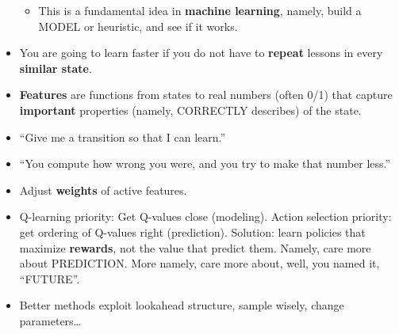\documentclass[twocolumn]{article}
\begin{document}
\begin{itemize}
\begin{itemize}
  \item This is a fundamental idea in \textbf{machine learning},
    namely, build a MODEL or heuristic, and see if it works.
  \end{itemize}
\item You are going to learn faster if you do not have to
  \textbf{repeat} lessons in every \textbf{similar state}.
\item \textbf{Features} are functions from states to real numbers
  (often 0/1) that capture \textbf{important} properties (namely,
  CORRECTLY describes) of the state.
\item ``Give me a transition so that I can learn.''
\item ``You compute how wrong you were, and you try to make that
  number less.''
\item Adjust \textbf{weights} of active features.
\item Q-learning priority: Get Q-values close (modeling). Action
  selection priority: get ordering of Q-values right
  (prediction). Solution: learn policies that maximize
  \textbf{rewards}, not the value that predict them. Namely, care more
  about PREDICTION. More namely, care more about, well, you named it,
  ``FUTURE''.
\item Better methods exploit lookahead structure, sample wisely,
  change parameters\ldots
\end{itemize}
\end{document}
